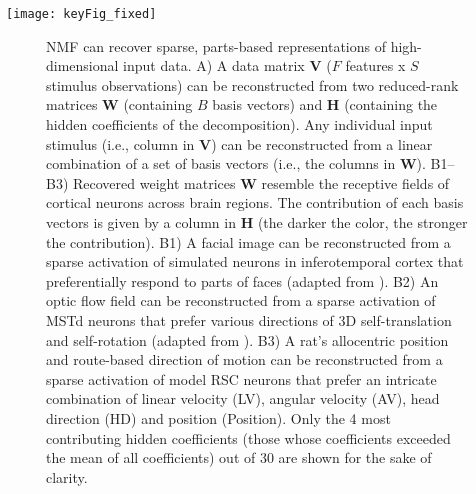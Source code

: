 \begin{figure*}[h]
	\centering
	\texttt{[image: keyFig\_fixed]}
	\label{fig:NMF|reconstruction}
\end{figure*}

\begin{figure}[t!]
	\centering
    \caption{\ac{NMF} can recover sparse, parts-based
         representations of high-dimensional input data.
         A)  A data matrix \textbf{V} ($F$ features x $S$ stimulus
             observations) can be reconstructed from two reduced-rank
             matrices \textbf{W} (containing $B$ basis vectors) and 
             \textbf{H} (containing the hidden coefficients of the
             decomposition).
             Any individual input stimulus (i.e., column in \textbf{V})
             can be reconstructed from a linear combination of a set of
             basis vectors (i.e., the columns in \textbf{W}).
         B1--B3) Recovered weight matrices \textbf{W} resemble the
             receptive fields of cortical neurons across brain regions. The contribution of each basis vectors is given by a column 
             in \textbf{H} (the darker the color, the stronger the
             contribution).
         B1) A facial image can be reconstructed from a sparse activation
             of simulated neurons in inferotemporal cortex that
             preferentially respond to parts of faces
             (adapted from \cite{LeeSeung1999}).
         B2) An optic flow field can be reconstructed from a sparse
             activation of \ac{MSTd} neurons that prefer various
             directions of 3D self-translation and self-rotation
             (adapted from \cite{Beyeler2016}).
         B3) A rat's allocentric position and route-based direction of
             motion can be reconstructed from a sparse activation of
             model \ac{RSC} neurons that prefer an intricate combination of
             linear velocity (LV), angular velocity (AV), head direction (HD)
             and position (Position). Only the 4 most contributing hidden coefficients (those whose coefficients exceeded the mean of all coefficients) out of 30 are shown for the
             sake of clarity.}
	\label{fig:NMF|reconstruction}
\end{figure}


